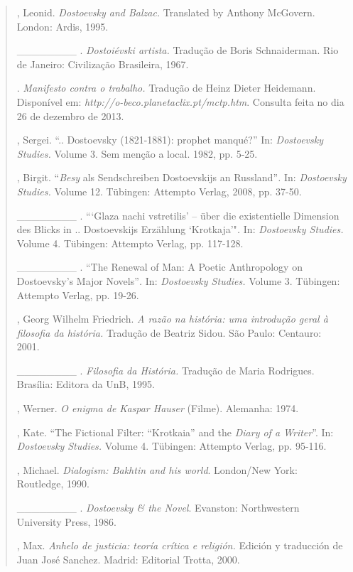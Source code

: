 {\begin{quote}
\begin{Parskip}
, Leonid. \emph{Dostoevsky and Balzac.} Translated by Anthony
McGovern. London: Ardis, 1995.

\_\_\_\_\_\_\_\_ . \emph{Dostoiévski artista.} Tradução de Boris
Schnaiderman. Rio de Janeiro: Civilização Brasileira, 1967.

 . \emph{Manifesto contra o trabalho.} Tradução de Heinz
Dieter Heidemann. Disponível em:
\emph{http://o-beco.planetaclix.pt/mctp.htm}.
Consulta feita no dia 26 de dezembro de 2013.

, Sergei. ``.. Dostoevsky (1821-1881): prophet manqué?'' In:
\emph{Dostoevsky Studies.} Volume 3. Sem menção a local. 1982, pp. 5-25.

, Birgit. ``\emph{Besy} als Sendschreiben Dostoevskijs an
Russland''\emph{.} In: \emph{Dostoevsky Studies.} Volume 12. Tübingen:
Attempto Verlag, 2008, pp. 37-50.

\_\_\_\_\_\_\_\_ . ```Glaza nachi vstretilis' -- über die existentielle
Dimension des Blicks in .. Dostoevskijs Erzählung `Krotkaja'"\emph{.}
In: \emph{Dostoevsky Studies.} Volume 4. Tübingen: Attempto Verlag, pp.
117-128.

\_\_\_\_\_\_\_\_ . ``The Renewal of Man: A Poetic Anthropology on
Dostoevsky's Major Novels''\emph{.} In: \emph{Dostoevsky Studies.}
Volume 3. Tübingen: Attempto Verlag, pp. 19-26.

, Georg Wilhelm Friedrich. \emph{A razão na história: uma
introdução geral à filosofia da história.} Tradução de Beatriz Sidou.
São Paulo: Centauro: 2001.

\_\_\_\_\_\_\_\_ . \emph{Filosofia da História.} Tradução de Maria
Rodrigues. Brasília: Editora da UnB, 1995.

, Werner. \emph{O enigma de Kaspar Hauser} (Filme). Alemanha:
1974.

, Kate. ``The Fictional Filter: ``Krotkaia'' and the \emph{Diary
of a Writer}''. In: \emph{Dostoevsky Studies.} Volume 4. Tübingen:
Attempto Verlag, pp. 95-116.

, Michael. \emph{Dialogism: Bakhtin and his world}. London/New
York: Routledge, 1990.

\_\_\_\_\_\_\_\_ . \emph{Dostoevsky \& the Novel}. Evanston:
Northwestern University Press, 1986.

, Max. \emph{Anhelo de justicia: teoría crítica e religión.}
Edición y traducción de Juan José Sanchez. Madrid: Editorial Trotta,
2000.


\end{Parskip}
\end{quote}}

